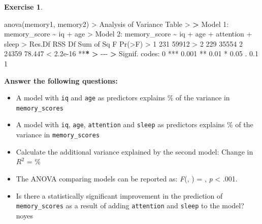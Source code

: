 \documentclass[
]{book}
\newenvironment{Shaded}{\begin{snugshade}}{\end{snugshade}}
\newcommand{\DecValTok}[1]{\textcolor[rgb]{0.00,0.00,0.81}{#1}}
\newcommand{\ErrorTok}[1]{\textcolor[rgb]{0.64,0.00,0.00}{\textbf{#1}}}
\newcommand{\FloatTok}[1]{\textcolor[rgb]{0.00,0.00,0.81}{#1}}
\newcommand{\FunctionTok}[1]{\textcolor[rgb]{0.00,0.00,0.00}{#1}}
\newcommand{\NormalTok}[1]{#1}
\newcommand{\SpecialCharTok}[1]{\textcolor[rgb]{0.00,0.00,0.00}{#1}}
\newcommand{\StringTok}[1]{\textcolor[rgb]{0.31,0.60,0.02}{#1}}
\theoremstyle{definition}
\theoremstyle{definition}
\theoremstyle{definition}
\newtheorem{exercise}{Exercise}[chapter]
\theoremstyle{definition}
\theoremstyle{remark}
\begin{document}
\begin{exercise}
\begin{Shaded}
\begin{Highlighting}[]
\FunctionTok{anova}\NormalTok{(memory1, memory2)}
\SpecialCharTok{\textgreater{}}\NormalTok{ Analysis of Variance Table}
\SpecialCharTok{\textgreater{}} 
\ErrorTok{\textgreater{}}\NormalTok{ Model }\DecValTok{1}\SpecialCharTok{:}\NormalTok{ memory\_score }\SpecialCharTok{\textasciitilde{}}\NormalTok{ iq }\SpecialCharTok{+}\NormalTok{ age}
\SpecialCharTok{\textgreater{}}\NormalTok{ Model }\DecValTok{2}\SpecialCharTok{:}\NormalTok{ memory\_score }\SpecialCharTok{\textasciitilde{}}\NormalTok{ iq }\SpecialCharTok{+}\NormalTok{ age }\SpecialCharTok{+}\NormalTok{ attention }\SpecialCharTok{+}\NormalTok{ sleep}
\SpecialCharTok{\textgreater{}}\NormalTok{   Res.Df   RSS Df Sum of Sq      F    }\FunctionTok{Pr}\NormalTok{(}\SpecialCharTok{\textgreater{}}\NormalTok{F)    }
\SpecialCharTok{\textgreater{}} \DecValTok{1}    \DecValTok{231} \DecValTok{59912}                                  
\SpecialCharTok{\textgreater{}} \DecValTok{2}    \DecValTok{229} \DecValTok{35554}  \DecValTok{2}     \DecValTok{24359} \FloatTok{78.447} \SpecialCharTok{\textless{}} \FloatTok{2.2e{-}16} \SpecialCharTok{**}\ErrorTok{*}
\ErrorTok{\textgreater{}} \SpecialCharTok{{-}{-}{-}}
\ErrorTok{\textgreater{}}\NormalTok{ Signif. codes}\SpecialCharTok{:}  \DecValTok{0} \StringTok{\textquotesingle{}***\textquotesingle{}} \FloatTok{0.001} \StringTok{\textquotesingle{}**\textquotesingle{}} \FloatTok{0.01} \StringTok{\textquotesingle{}*\textquotesingle{}} \FloatTok{0.05} \StringTok{\textquotesingle{}.\textquotesingle{}} \FloatTok{0.1} \StringTok{\textquotesingle{} \textquotesingle{}} \DecValTok{1}
\end{Highlighting}
\end{Shaded}

\hfill\break
\hfill\break
\textbf{Answer the following questions:}

\begin{itemize}
\item
  A model with \texttt{iq} and \texttt{age} as predictors explains \% of the variance in \texttt{memory\_scores}
\item
  A model with \texttt{iq}, \texttt{age}, \texttt{attention} and \texttt{sleep} as predictors explains \% of the variance in \texttt{memory\_scores}
\item
  Calculate the additional variance explained by the second model: Change in \(R^2\) = \%
\item
  The ANOVA comparing models can be reported as: \emph{F}(, ) = , \emph{p} \textless{} .001.
\item
  Is there a statistically significant improvement in the prediction of \texttt{memory\_scores} as a result of adding \texttt{attention} and \texttt{sleep} to the model? noyes
\end{itemize}


\end{exercise}
\end{document}
